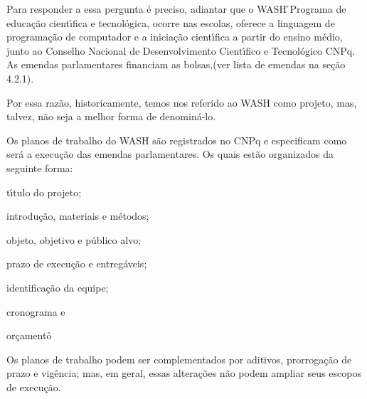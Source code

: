 \documentclass[
12pt,		%
openright,	%
twoside,  %
a4paper,			%
chapter=TITLE,		%
english,			%
french,				%
spanish,			%
brazil				%
]{USPSC-classe/USPSC}
\begin{document}
Para responder a essa pergunta \'e preciso, adiantar que o WASH \r\ncomo Programa de educa\c{c}\~ao cient\'{\i}fica e tecnol\'ogica, ocorre nas escolas, oferece a linguagem de programa\c{c}\~ao de computador e a inicia\c{c}\~ao cient\'{\i}fica a partir do  ensino m\'edio, junto ao Conselho Nacional de Desenvolvimento Cient\'{\i}fico e Tecnol\'ogico CNPq. As emendas parlamentares financiam as bolsas,(ver  lista de emendas na se\c{c}\~ao 4.2.1).

















Por essa raz\~ao, historicamente, temos nos referido ao WASH como projeto, mas, talvez, n\~ao seja a melhor forma de denomin\'a-lo.

















Os planos de trabalho do WASH s\~ao registrados no CNPq e especificam como ser\'a a execu\c{c}\~ao das emendas parlamentares. Os quais est\~ao organizados da seguinte forma:


















\begin{alineas}
\item t\'{\i}tulo do projeto;
\item introdu\c{c}\~ao, materiais e m\'etodos;
\item objeto, objetivo e p\'ublico alvo;
\item prazo de execu\c{c}\~ao e entreg\'aveis;
\item identifica\c{c}\~ao da equipe;
\item cronograma e
\item or\c{c}amento\r\n
\end{alineas}

Os planos de trabalho podem ser complementados por aditivos, prorroga\c{c}\~ao de prazo e vig\^encia; mas, em geral, essas altera\c{c}\~oes n\~ao podem ampliar seus escopos de execu\c{c}\~ao.
\end{document}
